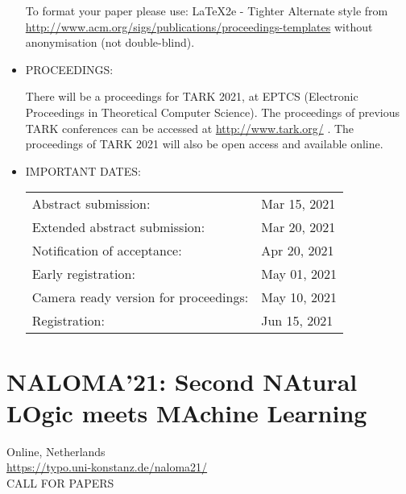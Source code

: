 \documentclass{article}
\begin{document}
\begin{itemize}
  To format your paper please use: LaTeX2e - Tighter Alternate style from \href{http://www.acm.org/sigs/publications/proceedings-templates}{http://www.acm.org/sigs/publications/proceedings-templates} without anonymisation (not double-blind). 
 
\item  PROCEEDINGS: 
 
  There will be a proceedings for TARK 2021, at EPTCS (Electronic Proceedings in Theoretical Computer Science). The proceedings of previous TARK conferences can be accessed at \href{http://www.tark.org/}{http://www.tark.org/} . The proceedings of TARK 2021 will also be open access and available online. 
 
\item  IMPORTANT DATES: 
 
\begin{tabulary}{\linewidth}{LL}Abstract submission:  & Mar 15, 2021 \\
Extended abstract submission:  & Mar 20, 2021 \\
Notification of acceptance:  & Apr 20, 2021 \\
Early registration:  & May 01, 2021 \\
Camera ready version for proceedings:  & May 10, 2021 \\
Registration:  & Jun 15, 2021 \\
\end{tabulary}
 
\end{itemize}\section{NALOMA'21: Second NAtural LOgic meets MAchine Learning }\label{NALOMA21}  Online, Netherlands\\ 
  \href{https://typo.uni-konstanz.de/naloma21/}{https://typo.uni-konstanz.de/naloma21/}\\ 
CALL FOR PAPERS 
\end{document}
